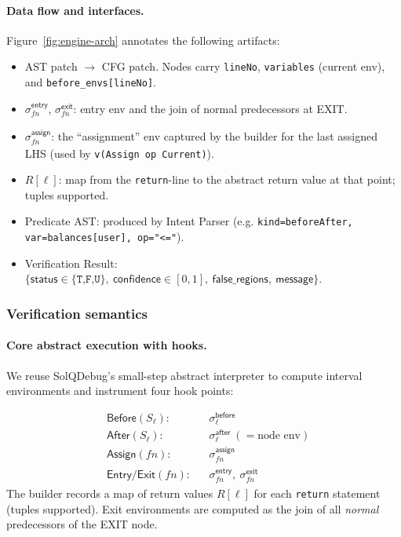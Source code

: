 \documentclass[10pt, conference]{IEEEtran}
\begin{document}
\paragraph{Data flow and interfaces.}
Figure~\ref{fig:engine-arch} annotates the following artifacts:

\begin{itemize}[leftmargin=*]
  \item \textsf{AST patch} \(\rightarrow\) \textsf{CFG patch}.
        Nodes carry \texttt{lineNo}, \texttt{variables}
        (current env), and \texttt{before\_envs[lineNo]}.
  \item \(\sigma^{\mathsf{entry}}_{\mathit{fn}}\),
        \(\sigma^{\mathsf{exit}}_{\mathit{fn}}\):
        entry env and the join of normal predecessors at EXIT.
  \item \(\sigma^{\mathsf{assign}}_{\mathit{fn}}\): the “assignment” env
        captured by the builder for the last assigned LHS (used by
        \verb|v(Assign op Current)|).
  \item \(R[\ell]\): map from the \texttt{return}-line to the abstract
        return value at that point; tuples supported.
  \item \textsf{Predicate AST}: produced by Intent Parser
        (e.g. \texttt{kind=beforeAfter, var=balances[user], op="<="}).
  \item \textsf{Verification Result}:
        \(\{\textsf{status}\in\{\texttt{T,F,U}\},\ \textsf{confidence}\in[0,1],\
          \textsf{false\_regions},\ \textsf{message}\}\).
\end{itemize}

\subsubsection{Verification semantics}

\paragraph{Core abstract execution with hooks.}
We reuse SolQDebug's small-step abstract interpreter to compute
interval environments and instrument four hook points:

\[
\begin{aligned}
&\textsf{Before}(S_\ell): && \sigma^{\mathsf{before}}_{\ell}\\
&\textsf{After}(S_\ell):  && \sigma^{\mathsf{after}}_{\ell} \ (= \text{node env})\\
&\textsf{Assign}(\mathit{fn}): && \sigma^{\mathsf{assign}}_{\mathit{fn}}\\
&\textsf{Entry/Exit}(\mathit{fn}): && \sigma^{\mathsf{entry}}_{\mathit{fn}},\
                                      \sigma^{\mathsf{exit}}_{\mathit{fn}}
\end{aligned}
\]
%
The builder records a map of return values \(R[\ell]\) for each
\texttt{return} statement (tuples supported).  Exit environments are
computed as the join of all \emph{normal} predecessors of the EXIT
node.
\end{document}
